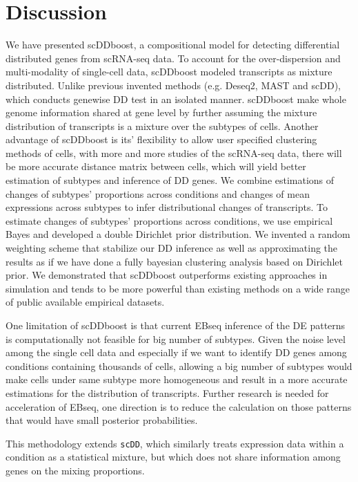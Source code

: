 \documentclass[aoas,preprint]{imsart}
\begin{document}
\section{Discussion}
We have presented scDDboost, a compositional model for detecting differential distributed genes from scRNA-seq data. To account for the over-dispersion and multi-modality of single-cell data, scDDboost modeled transcripts as mixture distributed. Unlike previous invented methods (e.g. Deseq2, MAST and scDD), which conducts genewise DD test in an isolated manner. scDDboost make whole genome information shared at gene level by further assuming the mixture distribution of transcripts is a mixture over the subtypes of cells. Another advantage of scDDboost is its' flexibility to allow user specified clustering methods of cells, with more and more studies of the scRNA-seq data, there will be more accurate distance matrix between cells, which will yield better estimation of subtypes and inference of DD genes. We combine estimations of changes of subtypes' proportions across conditions and changes of mean expressions across subtypes to infer distributional changes of transcripts. To estimate changes of subtypes' proportions across conditions, we use empirical Bayes and developed a double Dirichlet prior distribution.  We invented a random weighting scheme that stabilize our DD inference as well as approximating the results as if we have done a fully bayesian clustering analysis based on Dirichlet prior.  We demonstrated that scDDboost outperforms existing approaches in simulation and tends to be more powerful than existing methods on a wide range of public available empirical datasets. 

One limitation of scDDboost is that current EBseq inference of the DE patterns is computationally not feasible for big number of subtypes. Given the noise level among the single cell data and especially if we want to identify DD genes among conditions containing thousands of cells, allowing a big number of subtypes would make cells under same subtype more homogeneous and result in a more accurate estimations for the distribution of transcripts. Further research is needed for acceleration of EBseq, one direction is to reduce the calculation on those patterns that would have small posterior probabilities. 


This methodology extends \verb+scDD+\citep{ref:scDD},                        
which similarly treats expression data within a condition as a statistical mixture, but which does
not share information among genes on the mixing proportions.
\end{document}
